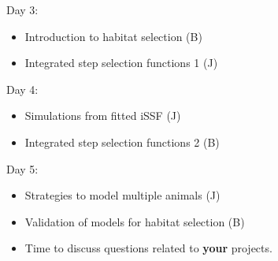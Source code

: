 \documentclass[ignorenonframetext,,t]{beamer}
\let\oldtextbf\textbf
\renewcommand{\textbf}[1]{\textcolor{spamwell}{\oldtextbf{#1}}}
\providecommand{\tightlist}{%
\setlength{\itemsep}{0pt}\setlength{\parskip}{0pt}}
\providecommand{\tightlist}{%
\setlength{\itemsep}{0pt}\setlength{\parskip}{0pt}}
\renewcommand{\tightlist}{\setlength{\itemsep}{1.4ex}\setlength{\parskip}{0pt}}
\begin{document}
\begin{frame}
\begin{block}{Day 3:}
\protect\hypertarget{day-3}{}
\begin{itemize}
\tightlist
\item
  Introduction to habitat selection (B)
\item
  Integrated step selection functions 1 (J)
\end{itemize}
\end{block}

\begin{block}{Day 4:}
\protect\hypertarget{day-4}{}
\begin{itemize}
\tightlist
\item
  Simulations from fitted iSSF (J)
\item
  Integrated step selection functions 2 (B)
\end{itemize}
\end{block}

\begin{block}{Day 5:}
\protect\hypertarget{day-5}{}
\begin{itemize}
\tightlist
\item
  Strategies to model multiple animals (J)
\item
  Validation of models for habitat selection (B)
\item
  Time to discuss questions related to \textbf{your} projects.
\end{itemize}
\end{block}
\end{frame}
\end{document}
